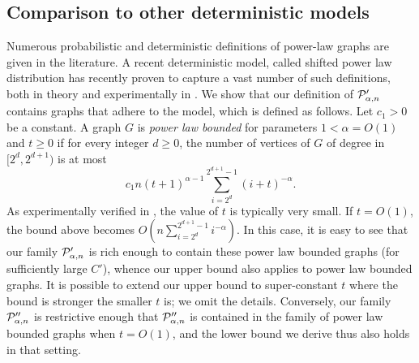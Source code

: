 \subsection{Comparison to other deterministic models}
Numerous probabilistic and  deterministic  definitions of power-law graphs are given in the literature.
A recent deterministic model, called  shifted power law distribution \cite{eom2011characterizing} has recently proven to capture a vast number of such definitions, both in theory and experimentally in \cite{Sankowski2016PowerLaw}.
We show that our definition of $ \mathcal{P}'_{\alpha,n}$ contains graphs that adhere to the model, which is defined as follows.
 Let $c_1 > 0$ be a constant. A graph $G$ is \emph{power law bounded} for parameters $1 < \alpha = O(1)$ and $t\geq 0$ if for every integer $d\geq 0$, the number of vertices of $G$ of degree in $[2^d,2^{d+1})$ is at most
\[
  c_1n(t+1)^{\alpha - 1}\sum_{i = 2^d}^{2^{d+1} - 1}(i+t)^{-\alpha}.
\]
As experimentally verified in \cite{Sankowski2016PowerLaw}, the value of $t$ is typically very small. If $t = O(1)$, the bound above becomes $O(n\sum_{i = 2^d}^{2^{d+1} - 1}i^{-\alpha})$. In this case, it is easy to see that our family $ \mathcal{P}'_{\alpha,n}$ is rich enough to contain these power law bounded graphs (for sufficiently large $C'$), whence our upper bound also applies to power law bounded graphs. It is possible to extend our upper bound to super-constant $t$ where the bound is stronger the smaller $t$ is; we omit the details. Conversely, our family $ \mathcal{P}''_{\alpha,n}$ is restrictive enough that
$ \mathcal{P}''_{\alpha,n}$ is contained in the family of power law bounded graphs when $t = O(1)$, and the lower bound we derive thus
also holds in that setting.




